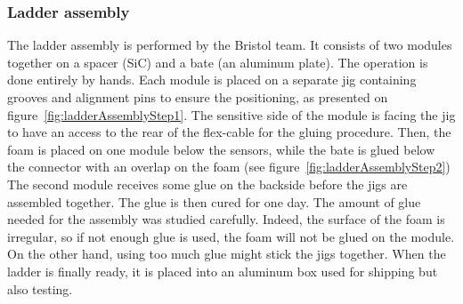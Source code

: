

    \subsubsection{Ladder assembly}

    The ladder assembly is performed by the Bristol team.
    It consists of two modules together on a spacer (\gls{SiC}) and a bate (an aluminum plate).
    The operation is done entirely by hands.
    Each module is placed on a separate jig containing grooves and alignment pins to ensure the positioning, as presented on figure~\ref{fig:ladderAssemblyStep1}.
    The sensitive side of the module is facing the jig to have an access to the rear of the flex-cable for the gluing procedure.
    Then, the foam is placed on one module below the sensors, while the bate is glued below the connector with an overlap on the foam (see figure~\ref{fig:ladderAssemblyStep2})
    The second module receives some glue on the backside before the jigs are assembled together.
    The glue is then cured for one day.
    The amount of glue needed for the assembly was studied carefully. 
    Indeed, the surface of the foam is irregular, so if not enough glue is used, the foam will not be glued on the module.
    On the other hand, using too much glue might stick the jigs together.
    When the ladder is finally ready, it is placed into an aluminum box used for shipping but also testing.
   
